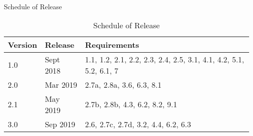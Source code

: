 {\begin{table}[hbt!]
\begin{adjustbox}{max width=\textwidth}
    \end{adjustbox}
      \caption{Schedule of Release}             
      \label{tab:schedule}                 
    \end{table}
}{
    \begin{table}[hbt!]                    
      \centering
    \begin{adjustbox}{max width=\textwidth}            
      \begin{tabular}{lll}                    
        \toprule          
          Version & 	Release	 & Requirements \\  \hline
          1.0	& Sept 2018 &	1.1, 1.2, 2.1, 2.2, 2.3, 2.4, 2.5, 3.1, 4.1, 4.2, 5.1, 5.2, 6.1, 7\\  \hline
          2.0	 & Mar 2019 &	2.7a, 2.8a, 3.6, 6.3, 8.1\\  \hline
          2.1	 & May 2019 &	2.7b, 2.8b, 4.3, 6.2, 8.2, 9.1\\  \hline
          3.0	 & Sep 2019 &	2.6, 2.7c, 2.7d, 3.2, 4.4, 6.2, 6.3\\  \hline
      \end{tabular}
    \end{adjustbox}
      \caption{Schedule of Release}             
      \label{tab:schedule}                 
    \end{table}
}

